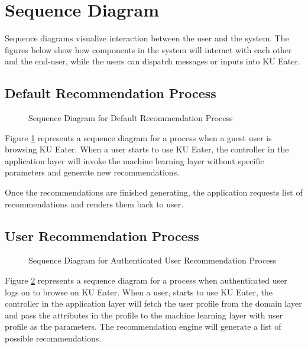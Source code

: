 \section{Sequence Diagram}
\label{section:sequence-diagram}

Sequence diagrams visualize interaction between the user and the system. The figures below show how components in the system will interact with
each other and the end-user, while the users can dispatch messages or inputs into KU Eater.

\subsection{Default Recommendation Process}
\begin{figure}[h!]
    \centering
    
    \caption{Sequence Diagram for Default Recommendation Process}
    \label{fig:seq-default-recommendation-process}
\end{figure}

Figure \ref{fig:seq-default-recommendation-process} represents a sequence diagram for a process when a guest user is browsing KU Eater. When a user
starts to use KU Eater, the controller in the application layer will invoke the machine learning layer without specific parameters and generate new recommendations.

Once the recommendations are finished generating, the application requests list of recommendations and renders them back to user.

\subsection{User Recommendation Process}
\begin{figure}[h!]
    \centering
    
    \caption{Sequence Diagram for Authenticated User Recommendation Process}
    \label{fig:seq-user-recommendation-process}
\end{figure}

Figure \ref{fig:seq-user-recommendation-process} represents a sequence diagram for a process when authenticated user logs on to browse on KU Eater.
When a user, starts to use KU Eater, the controller in the application layer will fetch the user profile from the domain layer and pass the attributes in the profile to
the machine learning layer with user profile as the parameters. The recommendation engine will generate a list of possible recommendations.

